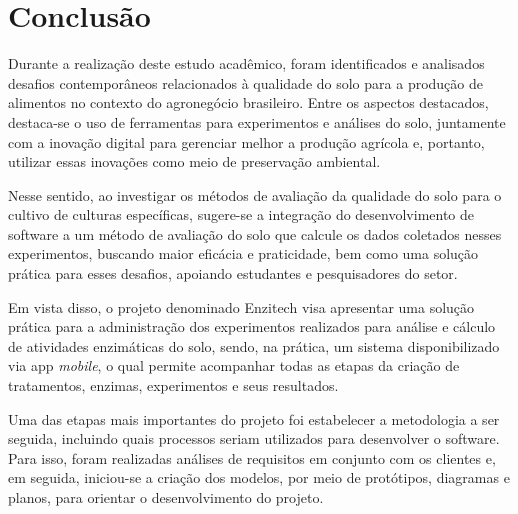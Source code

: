 \chapter{Conclusão}\label{ch:conclusao}
Durante a realização deste estudo acadêmico, foram identificados e analisados desafios contemporâneos relacionados à qualidade do solo para a produção de alimentos no contexto do agronegócio brasileiro. Entre os aspectos destacados, destaca-se o uso de ferramentas para experimentos e análises do solo, juntamente com a inovação digital para gerenciar melhor a produção agrícola e, portanto, utilizar essas inovações como meio de preservação ambiental. 

Nesse sentido, ao investigar os métodos de avaliação da qualidade do solo para o cultivo de culturas específicas, sugere-se a integração do desenvolvimento de software a um método de avaliação do solo que calcule os dados coletados nesses experimentos, buscando maior eficácia e praticidade, bem como uma solução prática para esses desafios, apoiando estudantes e pesquisadores do setor.

Em vista disso, o projeto denominado Enzitech visa apresentar uma solução prática para a administração dos experimentos realizados para análise e cálculo de atividades enzimáticas do solo, sendo, na prática, um sistema disponibilizado via \ac{app} \textit{mobile}, o qual permite acompanhar todas as etapas da criação de tratamentos, enzimas, experimentos e seus resultados.

Uma das etapas mais importantes do projeto foi estabelecer a metodologia a ser seguida, incluindo quais processos seriam utilizados para desenvolver o software. Para isso, foram realizadas análises de requisitos em conjunto com os clientes e, em seguida, iniciou-se a criação dos modelos, por meio de protótipos, diagramas e planos, para orientar o desenvolvimento do projeto.

